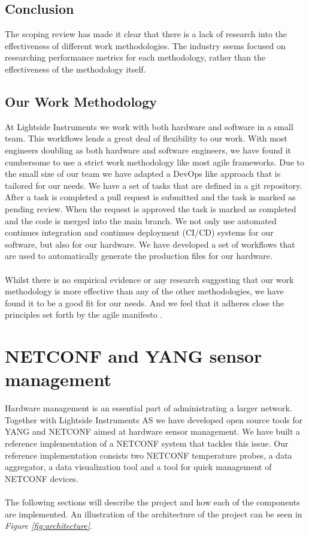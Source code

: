 \documentclass[12pt]{article}
\begin{document}
\subsection{Conclusion}
The scoping review has made it clear that there is a lack of research into the effectiveness of different work methodologies.
The industry seems focused on researching performance metrics for each methodology, rather than the 
effectiveness of the methodology itself.

\subsection{Our Work Methodology}
At Lightside Instruments we work with both hardware and software in a small team. 
This workflows lends a great deal of flexibility to our work.
With most engineers doubling as both hardware and software engineers, we have found it cumbersome to use a strict work methodology like most agile frameworks.
Due to the small size of our team we have adapted a DevOps like approach that is tailored for our needs. 
We have a set of tasks that are defined in a git repository. After a task is completed a pull request is submitted and the task
is marked as pending review. When the request is approved the task is marked as completed and the code is merged into the main branch.
We not only use automated continues integration and continues deployment (CI/CD) systems for our software, but also for our hardware.
We have developed a set of workflows that are used to automatically generate the production files for our hardware. 
\\
\\
Whilst there is no empirical evidence or any research suggesting that our work methodology is more effective than any of the other methodologies, 
we have found it to be a good fit for our needs. And we feel that it adheres close the principles set forth by the agile manifesto 
\cite{ManifestoAgileSoftware}.

\section{NETCONF and YANG sensor management}

Hardware management is an essential part of administrating a larger network. 
Together with Lightside Instruments AS we have 
developed open source tools for YANG and NETCONF aimed at hardware sensor management.
We have built a reference implementation of a NETCONF system that tackles this issue.
Our reference implementation consists two NETCONF temperature probes,
a data aggregator, a data visualization tool and
a tool for quick management of NETCONF devices.
\\
\\
The following sections will describe the project and how each of the components are implemented.
An illustration of the architecture of the project can be seen in \textit{Figure \ref{fig:architecture}}.
\end{document}
